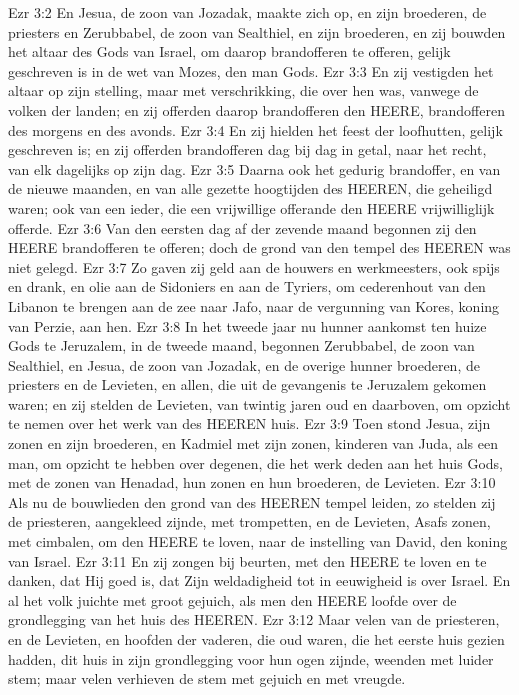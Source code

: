 Ezr 3:2  En Jesua, de zoon van Jozadak, maakte zich op, en zijn broederen, de priesters en Zerubbabel, de zoon van Sealthiel, en zijn broederen, en zij bouwden het altaar des Gods van Israel, om daarop brandofferen te offeren, gelijk geschreven is in de wet van Mozes, den man Gods.
Ezr 3:3  En zij vestigden het altaar op zijn stelling, maar met verschrikking, die over hen was, vanwege de volken der landen; en zij offerden daarop brandofferen den HEERE, brandofferen des morgens en des avonds.
Ezr 3:4  En zij hielden het feest der loofhutten, gelijk geschreven is; en zij offerden brandofferen dag bij dag in getal, naar het recht, van elk dagelijks op zijn dag.
Ezr 3:5  Daarna ook het gedurig brandoffer, en van de nieuwe maanden, en van alle gezette hoogtijden des HEEREN, die geheiligd waren; ook van een ieder, die een vrijwillige offerande den HEERE vrijwilliglijk offerde.
Ezr 3:6  Van den eersten dag af der zevende maand begonnen zij den HEERE brandofferen te offeren; doch de grond van den tempel des HEEREN was niet gelegd.
Ezr 3:7  Zo gaven zij geld aan de houwers en werkmeesters, ook spijs en drank, en olie aan de Sidoniers en aan de Tyriers, om cederenhout van den Libanon te brengen aan de zee naar Jafo, naar de vergunning van Kores, koning van Perzie, aan hen.
Ezr 3:8  In het tweede jaar nu hunner aankomst ten huize Gods te Jeruzalem, in de tweede maand, begonnen Zerubbabel, de zoon van Sealthiel, en Jesua, de zoon van Jozadak, en de overige hunner broederen, de priesters en de Levieten, en allen, die uit de gevangenis te Jeruzalem gekomen waren; en zij stelden de Levieten, van twintig jaren oud en daarboven, om opzicht te nemen over het werk van des HEEREN huis.
Ezr 3:9  Toen stond Jesua, zijn zonen en zijn broederen, en Kadmiel met zijn zonen, kinderen van Juda, als een man, om opzicht te hebben over degenen, die het werk deden aan het huis Gods, met de zonen van Henadad, hun zonen en hun broederen, de Levieten.
Ezr 3:10  Als nu de bouwlieden den grond van des HEEREN tempel leiden, zo stelden zij de priesteren, aangekleed zijnde, met trompetten, en de Levieten, Asafs zonen, met cimbalen, om den HEERE te loven, naar de instelling van David, den koning van Israel.
Ezr 3:11  En zij zongen bij beurten, met den HEERE te loven en te danken, dat Hij goed is, dat Zijn weldadigheid tot in eeuwigheid is over Israel. En al het volk juichte met groot gejuich, als men den HEERE loofde over de grondlegging van het huis des HEEREN.
Ezr 3:12  Maar velen van de priesteren, en de Levieten, en hoofden der vaderen, die oud waren, die het eerste huis gezien hadden, dit huis in zijn grondlegging voor hun ogen zijnde, weenden met luider stem; maar velen verhieven de stem met gejuich en met vreugde.
